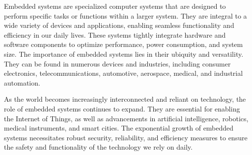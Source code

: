 Embedded systems are specialized computer systems that are designed to perform
specific tasks or functions within a larger system. They are integral to a wide
variety of devices and applications, enabling seamless functionality and
efficiency in our daily lives. These systems tightly integrate hardware and
software components to optimize performance, power consumption, and system size.
The importance of embedded systems lies in their ubiquity and versatility.
They can be found in numerous devices and industries, including consumer
electronics, telecommunications, automotive, aerospace, medical, and
industrial automation.

As the world becomes increasingly interconnected and reliant on technology,
the role of embedded systems continues to expand. They are essential
for enabling the Internet of Things, as well as advancements in
artificial intelligence, robotics, medical instruments, and smart cities.
The exponential growth of embedded systems necessitates robust security,
reliability, and efficiency measures to ensure the safety and functionality
of the technology we rely on daily.